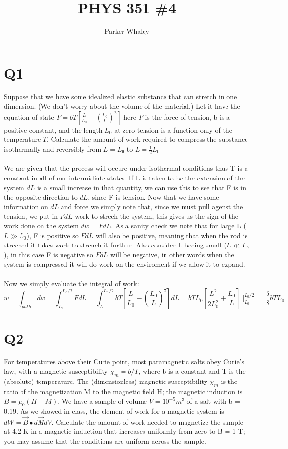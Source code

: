 \documentclass[10pt,a4paper]{article}
\author{Parker Whaley}
\title{PHYS 351 \#4}
\begin{document}
\maketitle

\section{Q1}

Suppose that we have some idealized elastic substance that can stretch in one dimension. (We don’t worry about the volume of the material.) Let it have the equation of state $F=bT[\frac{L}{L_0}-(\frac{L_0}{L})^2]$ here $F$ is the force of tension, b is a positive constant, and the length $L_0$ at zero tension is a function only of the temperature $T$.  Calculate the amount of work required to compress the substance isothermally and  reversibly from $L = L_0$ to $L = \frac{1}{2}L_0$\\\\

We are given that the process will occure under isothermal conditions thus T is a constant in all of our intermidiate states.  If L is taken to be the extension of the system $dL$ is a small increase in that quantity, we can use this to see that F is in the opposite direction to $dL$, since F is tension.  Now that we have some information on $dL$ and force we simply note that, since we must pull agenst the tension, we put in $FdL$ work to strech the system, this gives us the sign of the work done on the system $dw=FdL$.  As a sanity check we note that for large L ($L\gg L_0$), F is positive so $FdL$ will also be positive, meaning that when the rod is streched it takes work to streach it furthur.  Also consider L beeing small ($L\ll L_0$), in this case F is negative so $FdL$ will be negative, in other words when the system is compressed it will do work on the enviroment if we allow it to expand.\\\\

Now we simply evaluate the integral of work:
\[w=\int_{path}dw=\int_{L_0}^{L_0/2}FdL=\int_{L_0}^{L_0/2}bT[\frac{L}{L_0}-(\frac{L_0}{L})^2]dL=bTL_0[\frac{L^2}{2 L_0^2}+\frac{L_0}{L}]\mid_{L_0}^{L_0/2}=\frac{5}{8}bTL_0\]

\section{Q2}

For temperatures above their Curie point, most paramagnetic salts obey Curie’s law, with a magnetic susceptibility $\chi_m = b/T$, where b is a constant and T is the (absolute) temperature. The (dimensionless) magnetic susceptibility $\chi_m$ is the ratio of the magnetization M to the magnetic field H; the magnetic induction is $B = \mu_0(H + M)$. We have a sample of volume $V = 10^{-5} m^3$ of a salt with b = 0.19. As we showed in class, the element of work for a magnetic system is $dW = \vec{B} \bullet d\vec{M}dV$.  Calculate the amount of work needed to magnetize the sample at 4.2 K in a magnetic induction that increases uniformly from zero to B = 1 T; you may assume that the conditions are uniform across the sample.\\\\
\end{document}
